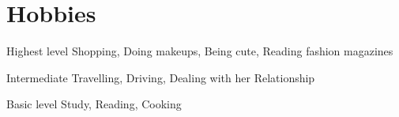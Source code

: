 \documentclass{tccv}
\begin{document}
\section{Hobbies}

\begin{factlist}

\item{Highest level}
     {Shopping, Doing makeups, Being cute, Reading fashion magazines}

\item{Intermediate}
     {Travelling, Driving, Dealing with her Relationship}

\item{Basic level}
     {Study, Reading, Cooking}

\end{factlist}
\end{document}
